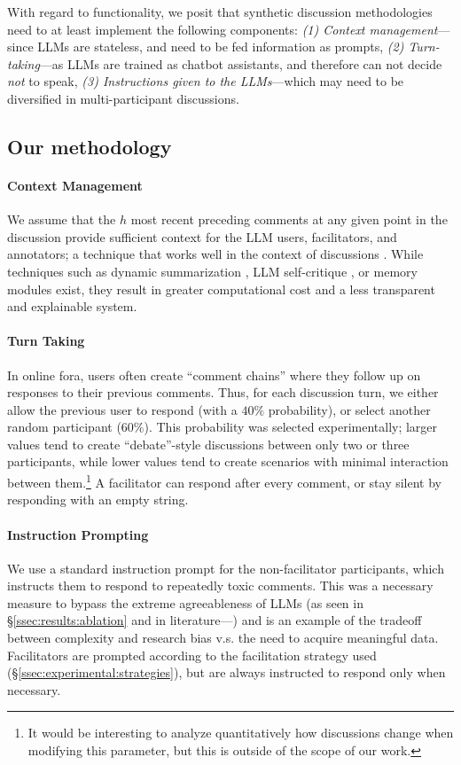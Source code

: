 With regard to functionality, we posit that synthetic discussion methodologies need to at least implement the following components: \emph{(1) Context management}---since LLMs are stateless, and need to be fed information as prompts, \emph{(2) Turn-taking}---as LLMs are trained as chatbot assistants, and therefore can not decide \emph{not} to speak, \emph{(3) Instructions given to the LLMs}---which may need to be diversified in multi-participant discussions.

\subsection{Our methodology}
\label{ssec:methodology:us}

\paragraph{Context Management} We assume that the $h$ most recent preceding comments at any given point in the discussion provide sufficient context for the LLM users, facilitators, and annotators; a technique that works well in the context of discussions \cite{pavlopoulos_2020_toxicity}. While techniques such as dynamic summarization \cite{balog_2024}, LLM self-critique \cite{yu_2024_fincon}, or memory modules \cite{Vezhnevets2023GenerativeAM} exist, they result in greater computational cost and a less transparent and explainable system.


\paragraph{Turn Taking} In online fora, users often create ``comment chains'' where they follow up on responses to their previous comments. Thus, for each discussion turn, we either allow the previous user to respond (with a $40\%$ probability), or select another random participant ($60\%$). This probability was selected experimentally; larger values tend to create ``debate''-style discussions between only two or three participants, while lower values tend to create scenarios with minimal interaction between them.\footnote{It would be interesting to analyze quantitatively how discussions change when modifying this parameter, but this is outside of the scope of our work.} A facilitator can respond after every comment, or stay silent by responding with an empty string.


\paragraph{Instruction Prompting} We use a standard instruction prompt for the non-facilitator participants, which instructs them to respond to repeatedly toxic comments. This was a necessary measure to bypass the extreme agreeableness of LLMs (as seen in \S\ref{ssec:results:ablation} and in literature---\citet{park2023game,anthis_2025}) and is an example of the tradeoff between complexity and research bias v.s. the need to acquire meaningful data. Facilitators are prompted according to the facilitation strategy used (\S\ref{ssec:experimental:strategies}), but are always instructed to respond only when necessary.


